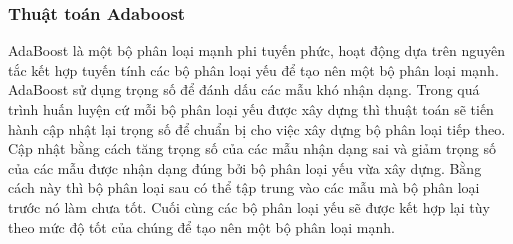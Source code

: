\documentclass[12pt,a4paper]{article}
\begin{document}
\subsubsection{Thuật toán Adaboost}
AdaBoost là một bộ phân loại mạnh phi tuyến phức, hoạt động dựa trên nguyên tắc kết hợp tuyến tính các bộ phân loại yếu để tạo nên một bộ phân loại mạnh. AdaBoost sử dụng trọng số để đánh dấu các mẫu khó nhận dạng. Trong quá trình huấn luyện cứ mỗi bộ phân loại yếu được xây dựng thì thuật toán sẽ tiến hành cập nhật lại trọng số để chuẩn bị cho việc xây dựng bộ phân loại tiếp theo. Cập nhật bằng cách tăng trọng số của các mẫu nhận dạng sai và giảm trọng số của các mẫu được nhận dạng đúng bởi bộ phân loại yếu vừa xây dựng. Bằng cách này thì bộ phân loại sau có thể tập trung vào các mẫu mà bộ phân loại trước nó làm chưa tốt. Cuối cùng các bộ phân loại yếu sẽ được kết hợp lại tùy theo mức độ tốt của chúng để tạo nên một bộ phân loại mạnh.
\end{document}
